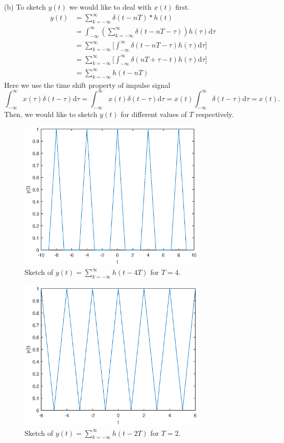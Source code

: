 \documentclass[a4paper]{article}
\begin{document}
(b) To sketch $y(t)$ we would like to deal with $x(t)$ first.
\begin{align*}
    y(t)&=\sum_{k=-\infty}^\infty\delta(t-nT)*h(t)\\
    &=\int_{-\infty}^\infty(\sum_{k=-\infty}^\infty\delta(t-nT-\tau))h(\tau)\mathrm{d}\tau\\
    &=\sum_{k=-\infty}^\infty\bigg[\int_{-\infty}^\infty\delta(t-nT-\tau)h(\tau)\mathrm{d}\tau\bigg]\\
    &=\sum_{k=-\infty}^\infty\bigg[\int_{-\infty}^\infty\delta(nT+\tau-t)h(\tau)\mathrm{d}\tau\bigg]\\
    &=\sum_{k=-\infty}^\infty h(t-nT)
\end{align*}
Here we use the time shift property of impulse signal
$$\int_{-\infty}^\infty x(\tau)\delta(t-\tau)\mathrm{d}\tau=\int_{-\infty}^\infty x(t)\delta(t-\tau)\mathrm{d}\tau=x(t)\int_{-\infty}^\infty\delta(t-\tau)\mathrm{d}\tau=x(t).$$
Then, we would like to sketch $y(t)$ for different values of $T$ respectively.
\begin{figure}[H]
    \begin{center}
        \includegraphics[width=0.8\textwidth]{6(b)-1.eps}
    \end{center}
    \caption{Sketch of $y(t)=\sum_{k=-\infty}^\infty h(t-4T)$ for $T=4$.}
\end{figure}
\begin{figure}[H]
    \begin{center}
        \includegraphics[width=0.8\textwidth]{6(b)-2.eps}
    \end{center}
    \caption{Sketch of $y(t)=\sum_{k=-\infty}^\infty h(t-2T)$ for $T=2$.}
\end{figure}
\end{document}
